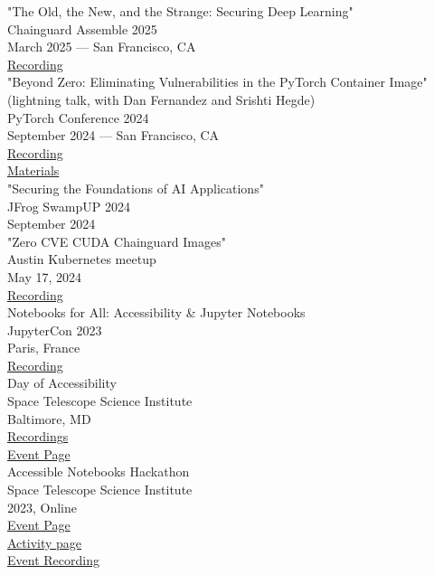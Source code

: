 \documentclass[11pt]{article}
\begin{document}
"The Old, the New, and the Strange: Securing Deep Learning"\\[0pt]
Chainguard Assemble 2025\\[0pt]
March 2025 — San Francisco, CA\\[0pt]
\href{https://www.youtube.com/watch?v=hmhKWjOyI0U}{Recording}\\[0pt]

"Beyond Zero: Eliminating Vulnerabilities in the PyTorch Container Image" (lightning talk, with Dan Fernandez and Srishti Hegde)\\[0pt]
PyTorch Conference 2024\\[0pt]
September 2024 — San Francisco, CA\\[0pt]
\href{https://www.youtube.com/watch?v=1klynk1dxYA}{Recording}\\[0pt]
\href{https://edu.chainguard.dev/chainguard/chainguard-images/about/beyond\_zero\_pytorch\_2024/}{Materials}\\[0pt]

"Securing the Foundations of AI Applications"\\[0pt]
JFrog SwampUP 2024\\[0pt]
September 2024\\[0pt]

"Zero CVE CUDA Chainguard Images"\\[0pt]
Austin Kubernetes meetup\\[0pt]
May 17, 2024\\[0pt]
\href{https://www.youtube.com/watch?v=Ry-kNHHmB\_0}{Recording}\\[0pt]

Notebooks for All: Accessibility \& Jupyter Notebooks\\[0pt]
JupyterCon 2023\\[0pt]
Paris, France\\[0pt]
\href{https://www.youtube.com/watch?v=LJMS9R-KFXQ}{Recording}\\[0pt]

Day of Accessibility\\[0pt]
Space Telescope Science Institute\\[0pt]
Baltimore, MD\\[0pt]
\href{https://www.youtube.com/playlist?list=PLCPZgcYzVpj\_WHHCTUpec8THYEMzXZnR1}{Recordings}\\[0pt]
\href{https://iota-school.github.io/day\_accessibility/}{Event Page}\\[0pt]

Accessible Notebooks Hackathon\\[0pt]
Space Telescope Science Institute\\[0pt]
2023, Online\\[0pt]
\href{https://iota-school.github.io/accessibility\_hackathon/}{Event Page}\\[0pt]
\href{https://iota-school.github.io/accessibility\_hackathon/hack}{Activity page}\\[0pt]
\href{https://www.youtube.com/watch?v=zskT7leTxXM}{Event Recording}\\[0pt]
\end{document}

